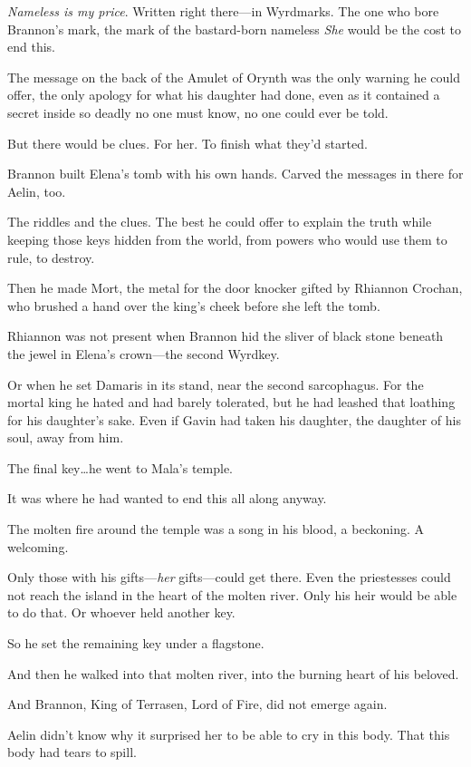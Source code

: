 \emph{Nameless is my price}.
Written right there---in Wyrdmarks.
The one who bore Brannon's mark, the mark of the bastard-born nameless 
\emph{She} would be the cost to end this.

The message on the back of the Amulet of Orynth was the only warning he could offer, the only apology for what his daughter had done, even as it contained a secret inside so deadly no one must know, no one could ever be told.

But there would be clues.
For her.
To finish what they'd started.

Brannon built Elena's tomb with his own hands.
Carved the messages in there for Aelin, too.

The riddles and the clues.
The best he could offer to explain the truth while keeping those keys hidden from the world, from powers who would use them to rule, to destroy.

Then he made Mort, the metal for the door knocker gifted by Rhiannon Crochan, who brushed a hand over the king's cheek before she left the tomb.

Rhiannon was not present when Brannon hid the sliver of black stone beneath the jewel in Elena's crown---the second Wyrdkey.

Or when he set Damaris in its stand, near the second sarcophagus.
For the mortal king he hated and had barely tolerated, but he had leashed that loathing for his daughter's sake.
Even if Gavin had taken his daughter, the daughter of his soul, away from him.

The final key\ldots he went to Mala's temple.

It was where he had wanted to end this all along anyway.

The molten fire around the temple was a song in his blood, a beckoning.
A welcoming.

Only those with his gifts---\emph{her} gifts---could get there.
Even the priestesses could not reach the island in the heart of the molten river.
Only his heir would be able to do that.
Or whoever held another key.

So he set the remaining key under a flagstone.

And then he walked into that molten river, into the burning heart of his beloved.

And Brannon, King of Terrasen, Lord of Fire, did not emerge again.

Aelin didn't know why it surprised her to be able to cry in this body.
That this body had tears to spill.

